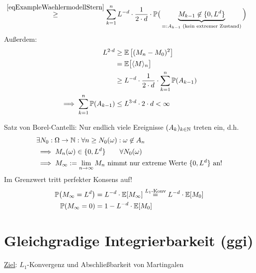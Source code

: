 \begin{beisp}[Wählermodell]
\begin{align*}
&\stackrel{\eqref{eqExampleWaehlermodellStern}}{\geq}
\sum\limits_{k=1}^n L^{-d}\cdot\frac{1}{2\cdot d}\cdot\P\big(\underbrace{M_{k-1}\not\in\lbrace0,L^d\rbrace}_{=:A_{k-1}\text{ (kein extremer Zustand)}}\Big)
\end{align*}
Außerdem:
\begin{align*}
L^{2\cdot d}
&\geq \E\left[(M_n-M_0)^2\right]\\
&=\E\big[\langle M\rangle_n\big]\\
&\geq L^{-d}\cdot\frac{1}{2\cdot d}\cdot\sum\limits_{k=1}^n\P(A_{k-1})\\
\implies
\sum\limits_{k=1}^n\P(A_{k-1})&\leq L^{3\cdot d}\cdot 2\cdot d<\infty
\end{align*}

Satz von Borel-Cantelli: Nur endlich viele Ereignisse $(A_k)_{k\in\N}$ treten ein, d.h.
\begin{align*}
&\exists N_0:\Omega\to\N:\forall n\geq N_0(\omega):\omega\not\in A_n\\
&\implies M_n(\omega)\in\lbrace0,L^d\rbrace\qquad\forall N_0(\omega)\\
&\implies M_\infty:=\limn M_n\text{ nimmt nur extreme Werte $\lbrace0,L^d\rbrace$ an!}
\end{align*}
Im Grenzwert tritt perfekter Konsens auf!
\begin{align*}
\P\big(M_\infty=L^d\big)&=L^{-d}\cdot\E[M_\infty]\stackeq{L_1\text{-Konv}} L^{-d}\cdot\E[M_0]\\
\P(M_\infty=0)&=1-L^{-d}\cdot\E[M_0]
\end{align*}
\end{beisp}

\setcounter{section}{1} %
\section{Gleichgradige Integrierbarkeit (ggi)} %
\setcounter{section}{4} %
\ul{Ziel}: $L_1$-Konvergenz und Abschließbarkeit von Martingalen

